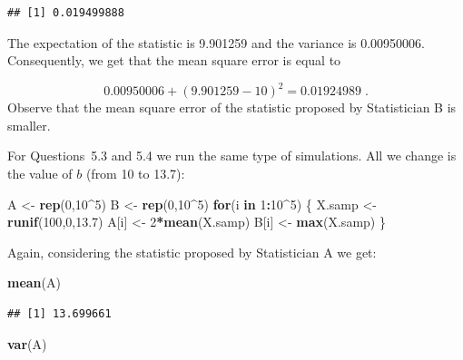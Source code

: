 \documentclass[]{krantz}
\makeatletter
\newenvironment{Shaded}{\begin{snugshade}}{\end{snugshade}}
\newcommand{\KeywordTok}[1]{\textcolor[rgb]{0.13,0.29,0.53}{\textbf{#1}}}
\newcommand{\DecValTok}[1]{\textcolor[rgb]{0.00,0.00,0.81}{#1}}
\newcommand{\FloatTok}[1]{\textcolor[rgb]{0.00,0.00,0.81}{#1}}
\newcommand{\StringTok}[1]{\textcolor[rgb]{0.31,0.60,0.02}{#1}}
\newcommand{\ControlFlowTok}[1]{\textcolor[rgb]{0.13,0.29,0.53}{\textbf{#1}}}
\newcommand{\OperatorTok}[1]{\textcolor[rgb]{0.81,0.36,0.00}{\textbf{#1}}}
\newcommand{\NormalTok}[1]{#1}
\newenvironment{kframe}{%
\medskip{}
\setlength{\fboxsep}{.8em}
 \def\at@end@of@kframe{}%
 \ifinner\ifhmode%
  \def\at@end@of@kframe{\end{minipage}}%
  \begin{minipage}{\columnwidth}%
 \fi\fi%
 \def\FrameCommand##1{\hskip\@totalleftmargin \hskip-\fboxsep
 \colorbox{shadecolor}{##1}\hskip-\fboxsep
     \hskip-\linewidth \hskip-\@totalleftmargin \hskip\columnwidth}%
 \MakeFramed {\advance\hsize-\width
   \@totalleftmargin\z@ \linewidth\hsize
   \@setminipage}}%
 {\par\unskip\endMakeFramed%
 \at@end@of@kframe}
\renewenvironment{Shaded}{\begin{kframe}}{\end{kframe}}
\theoremstyle{definition}
\theoremstyle{definition}
\theoremstyle{definition}
\theoremstyle{remark}
\makeatother
\begin{document}
\begin{verbatim}
## [1] 0.019499888
\end{verbatim}

The expectation of the statistic is 9.901259 and the variance is
0.00950006. Consequently, we get that the mean square error is equal to

\[0.00950006 + (9.901259 - 10)^2 = 0.01924989\;.\] Observe that the mean
square error of the statistic proposed by Statistician B is smaller.

For Questions~5.3 and 5.4 we run the same type of simulations. All we
change is the value of \(b\) (from 10 to 13.7):

\begin{Shaded}
\begin{Highlighting}[]
\NormalTok{A <-}\StringTok{ }\KeywordTok{rep}\NormalTok{(}\DecValTok{0}\NormalTok{,}\DecValTok{10}\OperatorTok{^}\DecValTok{5}\NormalTok{)}
\NormalTok{B <-}\StringTok{ }\KeywordTok{rep}\NormalTok{(}\DecValTok{0}\NormalTok{,}\DecValTok{10}\OperatorTok{^}\DecValTok{5}\NormalTok{)}
\ControlFlowTok{for}\NormalTok{(i }\ControlFlowTok{in} \DecValTok{1}\OperatorTok{:}\DecValTok{10}\OperatorTok{^}\DecValTok{5}\NormalTok{) \{}
\NormalTok{  X.samp <-}\StringTok{ }\KeywordTok{runif}\NormalTok{(}\DecValTok{100}\NormalTok{,}\DecValTok{0}\NormalTok{,}\FloatTok{13.7}\NormalTok{)}
\NormalTok{  A[i] <-}\StringTok{ }\DecValTok{2}\OperatorTok{*}\KeywordTok{mean}\NormalTok{(X.samp)}
\NormalTok{  B[i] <-}\StringTok{ }\KeywordTok{max}\NormalTok{(X.samp)}
\NormalTok{\}}
\end{Highlighting}
\end{Shaded}

Again, considering the statistic proposed by Statistician A we get:

\begin{Shaded}
\begin{Highlighting}[]
\KeywordTok{mean}\NormalTok{(A)}
\end{Highlighting}
\end{Shaded}

\begin{verbatim}
## [1] 13.699661
\end{verbatim}

\begin{Shaded}
\begin{Highlighting}[]
\KeywordTok{var}\NormalTok{(A)}
\end{Highlighting}
\end{Shaded}
\end{document}
